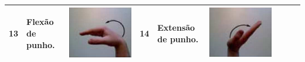 \begin{table}[htb]
\begin{tabular}{m{0.5cm} m{1.5cm} m{2cm} | m{0.5cm} m{1.5cm} m{2cm} | m{0.5cm} m{1.5cm} m{2cm}}
		13	&	Flexão de punho.	& \includegraphics[width=\linewidth]{./img/moves/mov13.png} &
		14	&	Extensão de punho.	& \includegraphics[width=\linewidth]{./img/moves/mov14.png}\\
		\midrule

\end{tabular}
\end{table}
